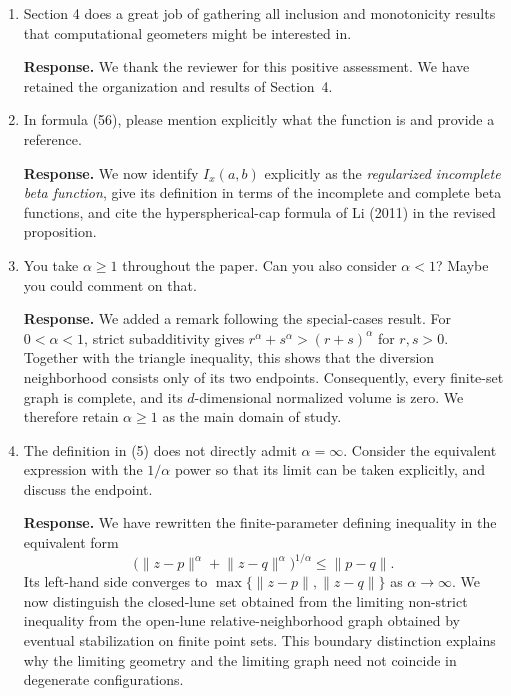 \documentclass[11pt]{article}
\newcommand{\tb}[1]{\textcolor[HTML]{0000bb}{#1}}
\begin{document}
\begin{enumerate}

\item \tb{Section 4 does a great job of gathering all inclusion and
monotonicity results that computational geometers might be interested in.}

\textbf{Response.} We thank the reviewer for this positive assessment.
We have retained the organization and results of Section~4.

\item \tb{In formula (56), please mention explicitly what the function is
and provide a reference.}

\textbf{Response.} We now identify $I_x(a,b)$ explicitly as the
\emph{regularized incomplete beta function}, give its definition in terms
of the incomplete and complete beta functions, and cite the
hyperspherical-cap formula of Li (2011) in the revised
proposition.

\item \tb{You take $\alpha\geq1$ throughout the paper. Can you also consider
$\alpha<1$? Maybe you could comment on that.}

\textbf{Response.} We added a remark following the special-cases result.
For $0<\alpha<1$, strict subadditivity gives
$r^\alpha+s^\alpha>(r+s)^\alpha$ for $r,s>0$.
Together with the triangle inequality, this shows that the diversion
neighborhood consists only of its two endpoints. Consequently, every
finite-set graph is complete, and its $d$-dimensional normalized volume
is zero. We therefore retain $\alpha\geq1$ as the main domain of study.

\item \tb{The definition in (5) does not directly admit $\alpha=\infty$.
Consider the equivalent expression with the $1/\alpha$ power so that
its limit can be taken explicitly, and discuss the endpoint.}

\textbf{Response.} We have rewritten the finite-parameter defining
inequality in the equivalent form
\[
  \bigl(\lVert z-p\rVert^\alpha+\lVert z-q\rVert^\alpha\bigr)^{1/\alpha}
  \leq \lVert p-q\rVert.
\]
Its left-hand side converges to
$\max\{\lVert z-p\rVert,\lVert z-q\rVert\}$ as $\alpha\to\infty$.
We now distinguish the closed-lune set obtained from the limiting
non-strict inequality from the open-lune relative-neighborhood graph
obtained by eventual stabilization on finite point sets. This
boundary distinction explains why the limiting geometry and the
limiting graph need not coincide in degenerate configurations.


\end{enumerate}
\end{document}
